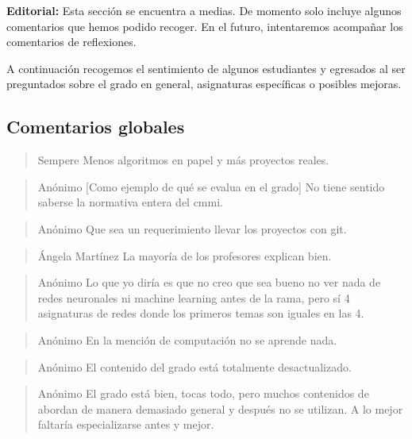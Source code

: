\textbf{Editorial:} Esta sección se encuentra a medias.
De momento solo incluye algunos comentarios que hemos podido recoger.
En el futuro, intentaremos acompañar los comentarios de reflexiones.

A continuación recogemos el sentimiento de algunos estudiantes y egresados
al ser preguntados sobre
el grado en general, asignaturas específicas o posibles mejoras.

\subsection{Comentarios globales}

\begin{quote}{Sempere}\label{qte:less-algorithms-in-paper}
    Menos algoritmos en papel y más proyectos reales.
\end{quote}

\begin{quote}{Anónimo}\label{qte:cmmi}
    [Como ejemplo de qué se evalua en el grado]
    No tiene sentido saberse la normativa entera del cmmi.
\end{quote}

\begin{quote}{Anónimo}
    Que sea un requerimiento llevar los proyectos con git.
\end{quote}

\begin{quote}{Ángela Martínez}
    La mayoría de los profesores explican bien.
\end{quote}

\begin{quote}{Anónimo}
    Lo que yo diría es que no creo que sea bueno
    no ver nada de redes neuronales ni machine learning antes de la rama,
    pero sí 4 asignaturas de redes donde los primeros temas
    son iguales en las 4.
\end{quote}

\begin{quote}{Anónimo}
    En la mención de computación no se aprende nada.
\end{quote}

\begin{quote}{Anónimo}
    El contenido del grado está totalmente desactualizado.
\end{quote}

\begin{quote}{Anónimo}
    El grado está bien, tocas todo,
    pero muchos contenidos de abordan de manera demasiado general y
    después no se utilizan.
    A lo mejor faltaría especializarse antes y mejor.
\end{quote}

